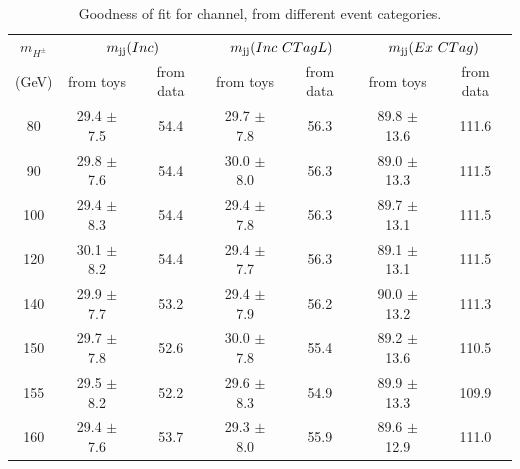\begin{table}
\caption{Goodness of fit for \mujets channel, from different event categories.}
\label{tab:gofMu}
\centering
\begin{adjustbox}{max width=\textwidth}
\begin{tabular}{ ccccccc}
\hline
\hline
\multicolumn{1}{c}{{\bf{$m_{H^\pm}$}}} & \multicolumn{2}{c}{$m_\text{jj}(Inc)$} & \multicolumn{2}{c}{$m_\text{jj}(Inc ~CTagL)$} & \multicolumn{2}{c}{$m_\text{jj}(Ex ~CTag)$} \\

(GeV) & from toys & from data & from toys & from data & from toys & from data  \\
 \hline
\hline
80  & 29.4 $\pm$ 7.5 & 54.4 & 29.7 $\pm$ 7.8 & 56.3 & 89.8 $\pm$ 13.6 & 111.6\\
  
90  & 29.8 $\pm$ 7.6 & 54.4 & 30.0 $\pm$ 8.0 & 56.3 & 89.0 $\pm$ 13.3 & 111.5\\
  
100  & 29.4 $\pm$ 8.3 & 54.4 & 29.4 $\pm$ 7.8 & 56.3 & 89.7 $\pm$ 13.1 & 111.5\\
  
120  & 30.1 $\pm$ 8.2 & 54.4 & 29.4 $\pm$ 7.7 & 56.3 & 89.1 $\pm$ 13.1 & 111.5\\
  
140  & 29.9 $\pm$ 7.7 & 53.2 & 29.4 $\pm$ 7.9 & 56.2 & 90.0 $\pm$ 13.2 & 111.3\\
  
150  & 29.7 $\pm$ 7.8 & 52.6 & 30.0 $\pm$ 7.8 & 55.4 & 89.2 $\pm$ 13.6 & 110.5\\
  
155  & 29.5 $\pm$ 8.2 & 52.2 & 29.6 $\pm$ 8.3 & 54.9 & 89.9 $\pm$ 13.3 & 109.9\\
  
160  & 29.4 $\pm$ 7.6 & 53.7 & 29.3 $\pm$ 8.0 & 55.9 & 89.6 $\pm$ 12.9 & 111.0\\
\hline
\end{tabular}
\end{adjustbox}
\end{table}

